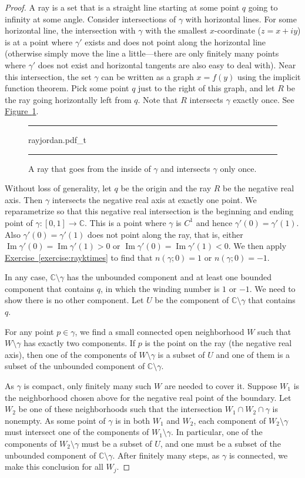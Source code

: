 \documentclass[12pt,openany]{book}
\renewcommand{\Im}{\operatorname{Im}}
\newcommand{\C}{{\mathbb{C}}}
\theoremstyle{plain}
\theoremstyle{remark}
\theoremstyle{definition}
\newenvironment{myfig}{%
\begin{figure}[h!t]
\noindent\rule{\textwidth}{0.5pt}\vspace{12pt}\par\centering}%
{\par\noindent\rule{\textwidth}{0.5pt}
\end{figure}}
\theoremstyle{exercise}
\theoremstyle{example}
\newcommand{\figureref}[1]{\hyperref[#1]{Figure~\ref*{#1}}}
\newcommand{\exerciseref}[1]{\hyperref[#1]{Exercise~\ref*{#1}}}
\begin{document}
\begin{proof}
A ray is a set that is a straight line starting at some point $q$
going to infinity at some angle.
Consider
intersections of $\gamma$ with horizontal lines.  For some horizontal line,
the intersection with $\gamma$ with the smallest $x$-coordinate ($z=x+iy$)
is at a point where $\gamma'$ exists and does not point along
the horizontal line (otherwise
simply move the line a little---there are only finitely many points where
$\gamma'$ does not exist and horizontal tangents are also easy to deal with).  Near this intersection, the set $\gamma$
can be written as a graph $x=f(y)$ using the implicit function theorem.
Pick some point $q$ just to the right of this graph, and let $R$ be the
ray going horizontally left from $q$.  Note that $R$ intersects $\gamma$ exactly
once.
See \figureref{fig:rayjordan}.
\begin{myfig}
{rayjordan.pdf_t}
\caption{A ray that goes from the inside of $\gamma$ and intersects $\gamma$
only once.\label{fig:rayjordan}}
\end{myfig}

Without loss of generality, let $q$ be the origin and
the ray $R$ be the negative real axis.  Then $\gamma$ intersects the negative
real axis at exactly one point.
We reparametrize so that this negative real intersection
is the beginning and ending point of $\gamma \colon [0,1] \to \C$.  This
is a point where $\gamma$ is $C^1$ and hence $\gamma'(0) =
\gamma'(1)$.  Also $\gamma'(0) = \gamma'(1)$ does not point along the ray,
that is, either
$\Im \gamma'(0) = \Im \gamma'(1) > 0$ or
$\Im \gamma'(0) = \Im \gamma'(1) < 0$.
We then apply
\exerciseref{exercise:rayktimes} to find that $n(\gamma;0) = 1$ or
$n(\gamma;0) = -1$.

In any case, $\C \setminus \gamma$ has the unbounded component
and at least one bounded component that contains $q$,
in which the winding number is $1$ or $-1$.  We
need to show there is no other component.  Let $U$ be the component of $\C
\setminus \gamma$ that contains $q$.

For any point $p \in \gamma$, we find a small connected open neighborhood
$W$ such that $W \setminus \gamma$ has exactly two components.
If $p$ is the point on the ray (the negative real axis), then one of the
components of $W \setminus \gamma$ is a subset of $U$ and one of them is a
subset of the unbounded component of $\C \setminus \gamma$.

As $\gamma$ is compact, only finitely many such $W$ are needed
to cover it.
Suppose $W_1$ is the neighborhood chosen above for the negative real point of
the boundary.  Let $W_2$ be one of these neighborhoods such that the
intersection $W_1 \cap W_2 \cap \gamma$ is nonempty.  As some point of $\gamma$ is
in both $W_1$ and $W_2$, each component of $W_2 \setminus \gamma$
must intersect one of the components of $W_1 \setminus \gamma$.  In
particular,
one of the components of $W_2 \setminus \gamma$ must be a subset of $U$,
and one must be a subset of the unbounded component of $\C \setminus
\gamma$.  After finitely many steps, as $\gamma$ is connected, we make this
conclusion for all $W_j$.


\end{proof}
\end{document}
